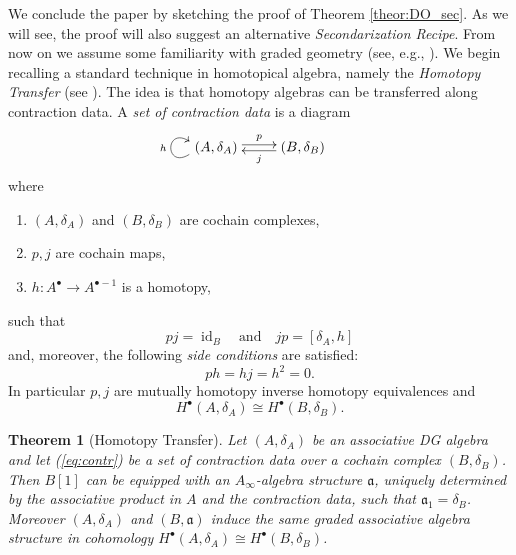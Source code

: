 \documentclass{conm-p-l}
\newtheorem{theorem}{Theorem}[section]
\theoremstyle{definition}
\theoremstyle{remark}
\numberwithin{equation}{section}
\begin{document}
We conclude the paper by sketching the proof of Theorem \ref{theor:DO_sec}. As we will see, the proof will also suggest an alternative \emph{Secondarization Recipe}. From now on we assume some familiarity with graded geometry (see, e.g., \cite{M2006}). We begin recalling a standard technique in homotopical algebra, namely the \emph{Homotopy Transfer} (see \cite{lv12, v14}). The idea is that homotopy algebras can be transferred along contraction data. A \emph{set of contraction data} is a diagram
\begin{equation}\label{eq:contr}
\xymatrix{     *{ \quad \quad \quad(A, \delta_A)\ }
\ar@(dl,ul)[]^-{h}\
\ar@<0.5ex>[r]^-{p} & *{\
(B,\delta_B)\quad\ \  \ \quad}  \ar@<0.5ex>[l]^-{j}}
\end{equation}
where 
\begin{enumerate}
\item $(A, \delta_A)$ and $(B, \delta_B)$ are cochain complexes,
\item $p, j$ are cochain maps,
\item $h : A^\bullet \to A^{\bullet -1}$ is a homotopy,
\end{enumerate}
such that
\[
pj = \operatorname{id}_B \quad \text{and} \quad jp = [\delta_A, h]
\]
and, moreover, the following \emph{side conditions} are satisfied:
\[
ph = hj = h^2 = 0.
\]
In particular $p, j$ are mutually homotopy inverse homotopy equivalences and
\[
H^\bullet(A, \delta_A) \cong H^\bullet (B, \delta_B).
\]

\begin{theorem}[Homotopy Transfer]
Let $(A, \delta_A)$ be an associative DG algebra and let (\ref{eq:contr}) be a set of contraction data over a cochain complex $(B, \delta_B)$. Then $B[1]$ can be equipped with an $A_\infty$-algebra structure $\mathfrak a$, uniquely determined by the associative product in $A$ and the contraction data, such that $\mathfrak a_1 = \delta_B$. Moreover $(A, \delta_A)$ and $(B, \mathfrak a)$ induce the same graded associative algebra structure in cohomology $H^\bullet(A, \delta_A) \cong H^\bullet (B, \delta_B)$.
\end{theorem}
\end{document}

